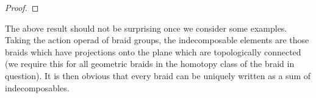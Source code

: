 \documentclass{amsbook} %
\newcommand{\ELn}{E\Lambda(\underline{n})}
\numberwithin{section}{chapter}
\begin{document}
\begin{proof}
\end{proof} 

\begin{rem}
The above result should not be surprising once we consider some examples. Taking the action operad of braid groups, the indecomposable elements are those braids which have projections onto the plane which are topologically connected (we require this for all geometric braids in the homotopy class of the braid in question). It is then obvious that every braid can be uniquely written as a sum of indecomposables.
\end{rem}

\end{document}
